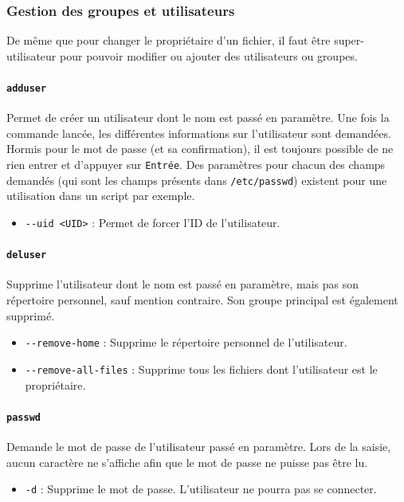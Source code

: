 \newpage
\subsubsection{Gestion des groupes et utilisateurs}

De même que pour changer le propriétaire d'un fichier, il faut être super-utilisateur pour pouvoir modifier ou ajouter des utilisateurs ou groupes.


\paragraph{\texttt{adduser}} 
Permet de créer un utilisateur dont le nom est passé en paramètre. Une fois la commande lancée, les différentes informations sur l'utilisateur sont demandées. Hormis pour le mot de passe (et sa confirmation), il est toujours possible de ne rien entrer et d'appuyer sur \texttt{Entrée}. Des paramètres pour chacun des champs demandés (qui sont les champs présents dans \texttt{/etc/passwd}) existent pour une utilisation dans un script par exemple.
\begin{itemize}
    \item \texttt{-{}-uid <UID>} : Permet de forcer l'ID de l'utilisateur.
\end{itemize}\vspace{\baselineskip}

\paragraph{\texttt{deluser}} 
Supprime l'utilisateur dont le nom est passé en paramètre, mais pas son répertoire personnel, sauf mention contraire. Son groupe principal est également supprimé.
\begin{itemize}
    \item \texttt{-{}-remove-home} : Supprime le répertoire personnel de l'utilisateur.
    \item \texttt{-{}-remove-all-files} : Supprime tous les fichiers dont l'utilisateur est le propriétaire.
\end{itemize}\vspace{\baselineskip}

\paragraph{\texttt{passwd}} 
Demande le mot de passe de l'utilisateur passé en paramètre. Lors de la saisie, aucun caractère ne s'affiche afin que le mot de passe ne puisse pas être lu.
\begin{itemize}
    \item \texttt{-d} : Supprime le mot de passe. L'utilisateur ne pourra pas se connecter.
\end{itemize}\vspace{\baselineskip}

